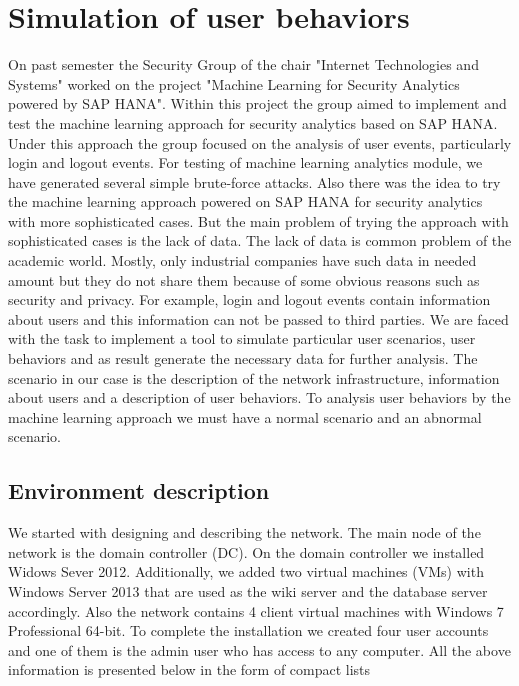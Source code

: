 \section{Simulation of user behaviors}
On past semester the Security Group of the chair "Internet Technologies and Systems" worked on the project "Machine Learning for Security Analytics powered by SAP HANA". Within this project the group aimed to implement and test the machine learning approach for security analytics based on SAP HANA. Under this approach the group focused on the analysis of user events, particularly login and logout events. For testing of machine learning analytics module, we have generated several simple brute-force attacks. Also there was the idea to try the machine learning approach powered on SAP HANA for security analytics with more sophisticated cases. But the main problem of trying the approach with sophisticated cases is the lack of data. The lack of data is common problem of the academic world. Mostly, only industrial companies have such data in needed amount but they do not share them because of some obvious reasons such as security and privacy. For example, login and logout events contain information about users and this information can not be passed to third parties. We are faced with the task to implement a tool to simulate particular user scenarios, user behaviors and as result generate the necessary data for further analysis.
The scenario in our case is the description of the network infrastructure, information about users and a description of user behaviors. To analysis user behaviors by the machine learning approach we must have a normal scenario and an abnormal scenario.  
  
\subsection{Environment description}
We started with designing and describing the network. The main node of the network is the domain controller (DC). On the domain controller we installed Widows Sever 2012. Additionally, we added two virtual machines (VMs) with Windows Server 2013 that are used as the wiki server and the database server accordingly. Also the network contains 4 client virtual machines with Windows 7 Professional 64-bit. To complete the installation we created four user accounts and one of them is the admin user who has access to any computer. All the above information is presented below in the form of compact lists

